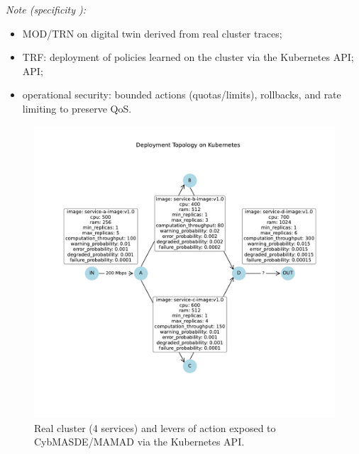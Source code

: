 \medskip
\noindent\textit{Note (specificity ):}
\begin{itemize}
  \item \textsc{MOD/TRN} on digital twin derived from real cluster traces;
  \item \textsc{TRF}: deployment of policies learned on the cluster via the Kubernetes API; {API};
  \item operational security: bounded actions (quotas/limits), rollbacks, and rate limiting to preserve QoS.
\end{itemize}

\begin{figure}[h!]
  \centering
  \includegraphics[trim=1.8cm 3.3cm 1.25cm 3.5cm, clip, width=\linewidth]{figures/k8s_cluster_graph.pdf}
  \caption{Real cluster  (4 services) and levers of action exposed to CybMASDE/MAMAD via the Kubernetes API.}
  \label{fig:k8s_microservices_real}
\end{figure}

